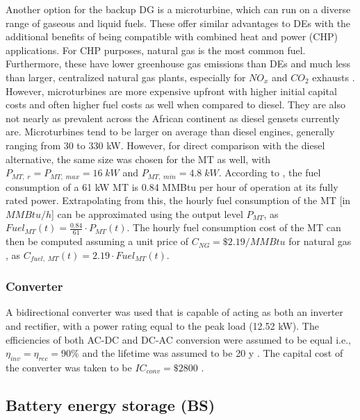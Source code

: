 \documentclass[final,3p,times]{elsarticle}
\begin{document}
Another option for the backup DG is a microturbine, which can run on a diverse range of gaseous and liquid fuels. These offer similar advantages to DEs with the additional benefits of being compatible with combined heat and power (CHP) applications. For CHP purposes, natural gas is the most common fuel. Furthermore, these have lower greenhouse gas emissions than DEs and much less than larger, centralized natural gas plants, especially for $NO_x$ and $CO_2$ exhausts \cite{wu2014}. However, microturbines are more expensive upfront with higher initial capital costs and often higher fuel costs as well when compared to diesel. They are also not nearly as prevalent across the African continent as diesel gensets currently are. Microturbines tend to be larger on average than diesel engines, generally ranging from 30 to 330 kW. However, for direct comparison with the diesel alternative, the same size was chosen for the MT as well, with $P_{MT,\; r} = P_{MT, \; max} = 16 \; kW$ and $P_{MT,\;min} = 4.8 \; kW$. According to \cite{chp_mt}, the fuel consumption of a 61 kW MT is 0.84 MMBtu per hour of operation at its fully rated power. Extrapolating from this, the hourly fuel consumption of the MT [in $MMBtu/h$] can be approximated using the output level $P_{MT}$, as $Fuel_{MT}(t) = \frac{0.84}{61} \cdot P_{MT}(t)$. The hourly fuel consumption cost of the MT can then be computed assuming a unit price of $C_{NG} = \$ 2.19/MMBtu$ for natural gas \cite{ng_price}, as $C_{fuel,\;MT}(t) = 2.19 \cdot Fuel_{MT}(t)$.

\subsubsection{Converter}

A bidirectional converter was used that is capable of acting as both an inverter and rectifier, with a power rating equal to the peak load (12.52 kW). The efficiencies of both AC-DC and DC-AC conversion were assumed to be equal i.e., $\eta_{inv} = \eta_{rec} = 90\%$ \cite{ogunjuyigbe2016} and the lifetime was assumed to be 20 y \cite{moshi2016}. The capital cost of the converter was taken to be $IC_{conv} = \$2800$ \cite{conv_price}.

\subsection{Battery energy storage (BS) \label{sec:BS}}
\end{document}
